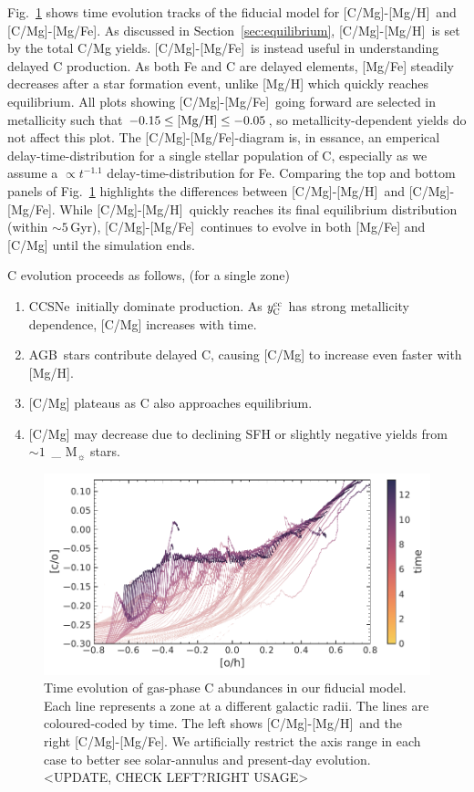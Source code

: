 \documentclass[fleqn,usenatbib]{mnras}
\newcommand{\agb}{AGB}
\newcommand{\cc}{CCSNe}
\newcommand{\caah}{[C/Mg]-[Mg/H]}
\newcommand{\caafe}{[C/Mg]-[Mg/Fe]}
\newcommand{\Ycc}{\ensuremath{y_{\rm C}^{\rm cc}}}
\newcommand{\Mo}{%
    \ifmmode {\rm M}_{\sun}%
    \else M$_{\sun}$
    \fi}
\newcommand{\about}[1]{${\sim} #1$}
\begin{document}
Fig.~\ref{fig:c_evo} shows time evolution tracks of the fiducial model for \caah\ and \caafe. 
As discussed in Section~\ref{sec:equilibrium}, \caah\ is set by the total C/Mg yields. 
\caafe\ is instead useful in understanding delayed C production. 
As both Fe and C are delayed elements, [Mg/Fe] steadily decreases after a star formation event, unlike [Mg/H] which quickly reaches equilibrium.  All plots showing \caafe\ going forward are selected in metallicity such that $-0.15 \leq {\rm [Mg/H]} \leq -0.05$, so metallicity-dependent yields do not affect this plot. 
The \caafe{}-diagram is, in essance, an emperical delay-time-distribution for a single stellar population of C, especially as we assume a $\propto t^{-1.1}$ delay-time-distribution for Fe. 
Comparing the top and bottom panels of Fig.~\ref{fig:c_evo} highlights the differences between \caah\ and \caafe. While \caah\ quickly reaches its final equilibrium distribution (within \about{5}\,Gyr), \caafe\ continues to evolve in both [Mg/Fe] and [C/Mg] until the simulation ends.

C evolution proceeds as follows, (for a single zone)
\begin{enumerate}
    \item \cc\ initially dominate production. As $\Ycc$ has strong metallicity dependence, [C/Mg] increases with time. 
    \item \agb\ stars contribute delayed C, causing [C/Mg] to increase even faster with [Mg/H]. 
    \item{} [C/Mg] plateaus as C also approaches equilibrium. 
    \item{} [C/Mg] may decrease due to declining SFH or slightly negative yields from \about{1}\,\Mo stars.

\end{enumerate}


\begin{figure}
\centering
\includegraphics{all_the_tracks.pdf}
\caption[]{
    Time evolution of gas-phase C abundances in our fiducial model.
    Each line represents a zone at a different galactic radii. The lines are coloured-coded by time. The left shows \caah\ and the right \caafe. We artificially restrict the axis range in each case to better see solar-annulus and present-day evolution.
    <UPDATE, CHECK LEFT?RIGHT USAGE>
}
\label{fig:c_evo}
\end{figure}
\end{document}
